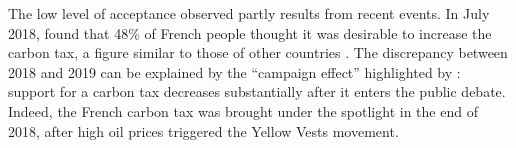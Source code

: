 \documentclass[english,5p,authoryear]{elsarticle}
\begin{document}
The low level of acceptance observed partly results from recent events. In July 2018, \citet{ademe_representations_2018} found that 48\% of French people thought it was desirable to increase the carbon tax, a figure similar to those of other countries \citep{brechin_public_2010}. The discrepancy between 2018 and 2019 can be explained by the ``campaign effect'' highlighted by \citet{anderson_can_2019}: support for a carbon tax decreases substantially after it enters the public debate. Indeed, the French carbon tax was brought under the spotlight in the end of 2018, after high oil prices triggered the Yellow Vests movement.




\end{document}

